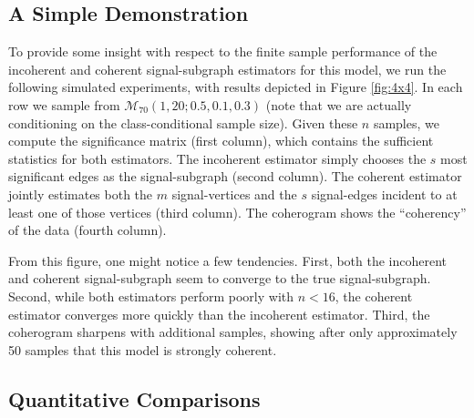 \documentclass[10pt,journal,cspaper,compsoc]{IEEEtran}
\providecommand{\mc}[1]{\mathcal{#1}}
\begin{document}
\subsection{A Simple Demonstration} %
\label{sub:a_simple_demonstration}
  

To provide some insight with respect to the finite sample performance of the incoherent and coherent signal-subgraph estimators for this model, we run the following simulated experiments, with results depicted in  Figure \ref{fig:4x4}.  In each row we sample from $\mc{M}_{70}(1,20;0.5,0.1,0.3)$  (note that we are actually conditioning on the class-conditional sample size).  Given these $n$ samples, we compute the significance matrix (first column), which contains the sufficient statistics for both estimators.  The incoherent estimator simply chooses the $s$ most significant edges as the signal-subgraph (second column). The coherent estimator jointly estimates both the $m$ signal-vertices and the $s$ signal-edges incident to at least one of those vertices (third column).  The coherogram shows the ``coherency'' of the data (fourth column).    

From this figure, one might notice a few tendencies.  First, both the incoherent and coherent signal-subgraph seem to converge to the true signal-subgraph.  Second, while 
both estimators perform poorly with $n < 16$, 
the coherent estimator converges more quickly than the incoherent estimator.  Third, the coherogram sharpens with additional samples,  showing after only approximately 50 samples that this model is strongly coherent.


\subsection{Quantitative Comparisons} %
\label{sub:quant}
\end{document}
